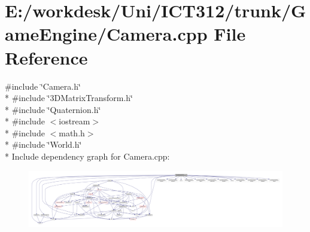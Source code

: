 \section{E\+:/workdesk/\+Uni/\+I\+C\+T312/trunk/\+Game\+Engine/\+Camera.cpp File Reference}
\label{_camera_8cpp}
{\ttfamily \#include \char`\"{}Camera.\+h\char`\"{}}\\*
{\ttfamily \#include \char`\"{}3\+D\+Matrix\+Transform.\+h\char`\"{}}\\*
{\ttfamily \#include \char`\"{}Quaternion.\+h\char`\"{}}\\*
{\ttfamily \#include $<$iostream$>$}\\*
{\ttfamily \#include $<$math.\+h$>$}\\*
{\ttfamily \#include \char`\"{}World.\+h\char`\"{}}\\*
Include dependency graph for Camera.\+cpp\+:
\nopagebreak
\begin{figure}[H]
\begin{center}
\leavevmode
\includegraphics[width=350pt]{d6/d37/_camera_8cpp__incl}
\end{center}
\end{figure}
